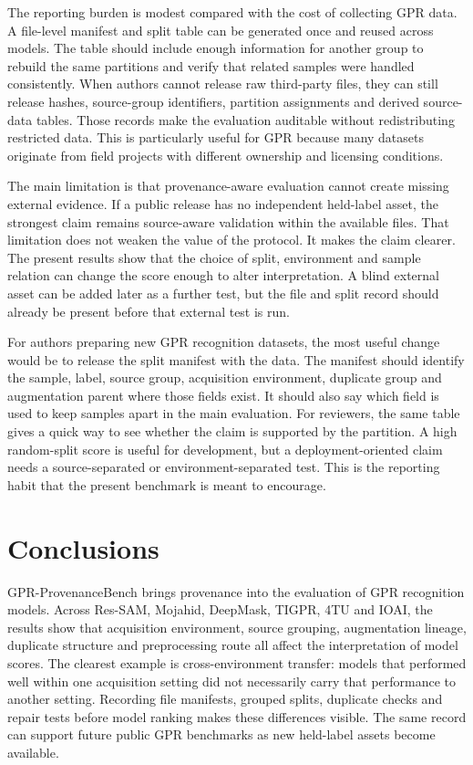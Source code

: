 \documentclass[]{interact}
\begin{document}
The reporting burden is modest compared with the cost of collecting GPR data. A file-level manifest and split table can be generated once and reused across models. The table should include enough information for another group to rebuild the same partitions and verify that related samples were handled consistently. When authors cannot release raw third-party files, they can still release hashes, source-group identifiers, partition assignments and derived source-data tables. Those records make the evaluation auditable without redistributing restricted data. This is particularly useful for GPR because many datasets originate from field projects with different ownership and licensing conditions.

The main limitation is that provenance-aware evaluation cannot create missing external evidence. If a public release has no independent held-label asset, the strongest claim remains source-aware validation within the available files. That limitation does not weaken the value of the protocol. It makes the claim clearer. The present results show that the choice of split, environment and sample relation can change the score enough to alter interpretation. A blind external asset can be added later as a further test, but the file and split record should already be present before that external test is run.

For authors preparing new GPR recognition datasets, the most useful change would be to release the split manifest with the data. The manifest should identify the sample, label, source group, acquisition environment, duplicate group and augmentation parent where those fields exist. It should also say which field is used to keep samples apart in the main evaluation. For reviewers, the same table gives a quick way to see whether the claim is supported by the partition. A high random-split score is useful for development, but a deployment-oriented claim needs a source-separated or environment-separated test. This is the reporting habit that the present benchmark is meant to encourage.

\section{Conclusions}

GPR-ProvenanceBench brings provenance into the evaluation of GPR recognition models. Across Res-SAM, Mojahid, DeepMask, TIGPR, 4TU and IOAI, the results show that acquisition environment, source grouping, augmentation lineage, duplicate structure and preprocessing route all affect the interpretation of model scores. The clearest example is cross-environment transfer: models that performed well within one acquisition setting did not necessarily carry that performance to another setting. Recording file manifests, grouped splits, duplicate checks and repair tests before model ranking makes these differences visible. The same record can support future public GPR benchmarks as new held-label assets become available.
\end{document}
